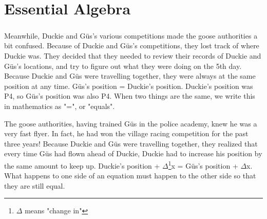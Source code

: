 \chapter{Essential Algebra}
\paragraph{} Meanwhile, Duckie and Güs's various competitions made the goose authorities a bit confused. Because of Duckie and Güs's competitions, they lost track of where Duckie was. They decided that they needed to review their records of Duckie and Güs's locations, and try to figure out what they were doing on the 5th day. 
\vfill
\pagebreak
{Because Duckie and Güs were travelling together, they were always at the same position at any time.}
{Güs's position = Duckie's position. Duckie's position was P4, so Güs's position was also P4.}
{When two things are the same, we write this in mathematics as "=", or "equals".}
{}
{The goose authorities, having trained Güs in the police academy, knew he was a very fast flyer. In fact, he had won the village racing competition for the past three years! Because Duckie and Güs were travelling together, they realized that every time Güs had flown ahead of Duckie, Duckie had to increase his position by the same amount to keep up.}
{Duckie's position + $\Delta$\footnote{$\Delta$ means "change in"}x = Güs's position + $\Delta$x.}
{What happens to one side of an equation must happen to the other side so that they are still equal.}
